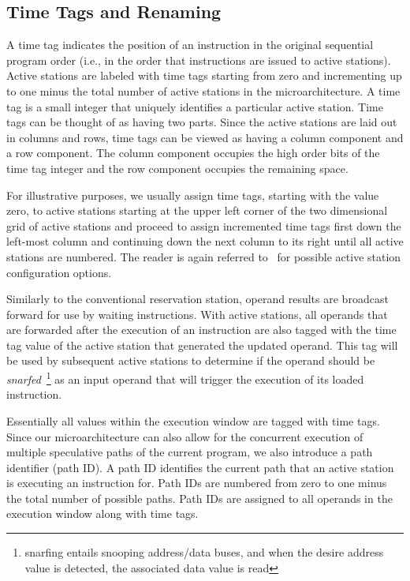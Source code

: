 \documentclass[10pt,twocolumn,dvips]{article}
\begin{document}
\subsection{Time Tags and Renaming}
\vspace{-0.1in}
A time tag indicates
the position of an instruction in the original 
sequential program order (i.e., in the order that instructions are issued
to active stations).  
Active stations are labeled with time tags starting
from zero and incrementing up to one minus the total number of
active stations in the microarchitecture.  
A time tag is a small
integer that uniquely identifies a particular active station.
Time tags can be thought of as having two
parts.  Since the active stations are laid out
in columns and rows, time tags can be viewed as having a column
component and a row component.  The column component 
occupies the high order bits of
the time tag integer and the row component occupies the remaining space.

For illustrative purposes, we usually assign time tags, starting with the
value zero,
to active stations starting at the upper left corner of the two
dimensional grid of active stations and proceed to assign incremented
time tags first down the left-most column and continuing down the
next column to its right until all active stations are numbered.
The reader is again referred to~\cite{Uht01} for possible
active station configuration options. 

Similarly to the conventional reservation station, operand results
are broadcast forward for use by waiting instructions.
With active stations, all operands that are forwarded after the execution
of an instruction are also tagged with the time tag value of the
active station that generated the updated operand.
This tag will be used by subsequent active stations to determine if
the operand should be {\em snarfed}~\footnote{snarfing entails snooping
address/data buses, and when the desire address value is detected, 
the associated data value is read} 
as an input operand that will trigger
the execution of its loaded instruction.

Essentially all values within the execution
window are tagged with time tags.
Since our microarchitecture can also allow for the concurrent
execution of multiple speculative paths of the current program,
we also introduce a path identifier (path ID).
A path ID 
identifies the current path that an active station is executing an instruction
for.  
Path IDs are numbered from zero
to one minus the total number of possible paths.
Path IDs are assigned to all operands in the execution window
along with time tags.
\end{document}
